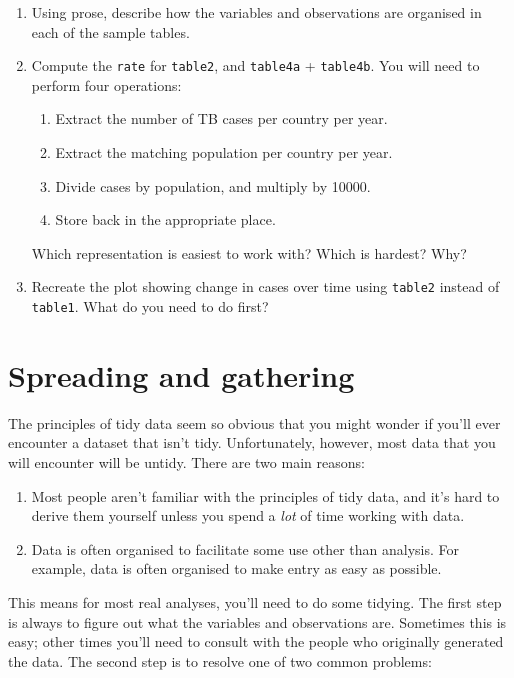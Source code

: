 \documentclass[]{book}
\providecommand{\tightlist}{%
  \setlength{\itemsep}{0pt}\setlength{\parskip}{0pt}}
\begin{document}
\begin{enumerate}
\def\labelenumi{\arabic{enumi}.}
\item
  Using prose, describe how the variables and observations are organised
  in each of the sample tables.
\item
  Compute the \texttt{rate} for \texttt{table2}, and \texttt{table4a} +
  \texttt{table4b}. You will need to perform four operations:

  \begin{enumerate}
  \def\labelenumii{\arabic{enumii}.}
  \tightlist
  \item
    Extract the number of TB cases per country per year.
  \item
    Extract the matching population per country per year.
  \item
    Divide cases by population, and multiply by 10000.
  \item
    Store back in the appropriate place.
  \end{enumerate}

  Which representation is easiest to work with? Which is hardest? Why?
\item
  Recreate the plot showing change in cases over time using
  \texttt{table2} instead of \texttt{table1}. What do you need to do
  first?
\end{enumerate}

\section{Spreading and gathering}\label{spreading-and-gathering}

The principles of tidy data seem so obvious that you might wonder if
you'll ever encounter a dataset that isn't tidy. Unfortunately, however,
most data that you will encounter will be untidy. There are two main
reasons:

\begin{enumerate}
\def\labelenumi{\arabic{enumi}.}
\item
  Most people aren't familiar with the principles of tidy data, and it's
  hard to derive them yourself unless you spend a \emph{lot} of time
  working with data.
\item
  Data is often organised to facilitate some use other than analysis.
  For example, data is often organised to make entry as easy as
  possible.
\end{enumerate}

This means for most real analyses, you'll need to do some tidying. The
first step is always to figure out what the variables and observations
are. Sometimes this is easy; other times you'll need to consult with the
people who originally generated the data. The second step is to resolve
one of two common problems:
\end{document}
